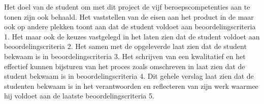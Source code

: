 \documentclass[a4paper, 11pt, oneside]{report}
\begin{document}
Het doel van de student om met dit project de vijf beroepscompetenties aan te tonen zijn ook behaald. Het vaststellen van de eisen aan het product in de  maar ook op andere plekken toont aan dat de student voldoet aan beoordelingscriteria 1. Het  maar ook de keuzes vastgelegd in het  laten zien dat de student voldoet aan beoordelingscriteria 2. Het  samen met de opgeleverde  laat zien dat de student bekwaam is in beoordelingscriteria 3. Het schrijven van een kwalitatief  en het effectief kunnen bijsturen van het proces zoals omschreven in  laat zien dat de student bekwaam is in beoordelingscriteria 4.
Dit gehele verslag laat zien dat de studenten bekwaam is in het verantwoorden en reflecteren van zijn werk waarmee hij voldoet aan de laatste beoordelingscriteria 5.
\end{document}
